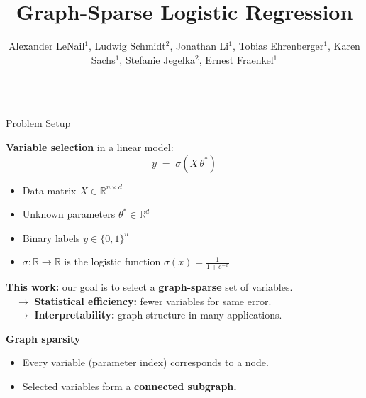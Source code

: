 \documentclass[svgnames,final]{beamer}
\title{Graph-Sparse Logistic Regression}
\author{Alexander LeNail$^1$, Ludwig Schmidt$^2$, Jonathan Li$^1$, Tobias Ehrenberger$^1$, Karen Sachs$^1$, Stefanie Jegelka$^2$, Ernest Fraenkel$^1$}
\institute{$^1$MIT BE, $^2$MIT CSAIL}
\newcommand{\R}{\ensuremath{\mathbb{R}}}
\newcommand{\thetastar}{\ensuremath{\theta^*}}
\begin{document}
\newlength{\gextlength}
\setlength{\gextlength}{14pt}
\newlength{\gselradius}
\setlength{\gselradius}{38pt}

\begin{frame}
\vspace{-.5cm}
\begin{columns}[T]

\begin{column}{.3\linewidth}

	\begin{block}{Problem Setup}

    \vspace{-.8cm}

    \textbf{Variable selection} in a linear model:
    {\Large
    \[
      y \; = \; \sigma(X \,  \thetastar)
    \]
    }

    \vspace{-.7cm}

    \begin{itemize}
      \item Data matrix $X \in \R^{n \times d}$\\[.2cm]
      \item Unknown parameters $\thetastar \in \R^d$\\[.2cm]
      \item Binary labels $y \in \{0,1\}^n$\\[.2cm]
      \item $\sigma: \R \rightarrow \R$ is the logistic function $\sigma(x) = \frac{1}{1 + e^{-x}}$
    \end{itemize}

    \vspace{1.2cm}
    \textbf{This work:} our goal is to select a \textbf{graph-sparse} set of variables.\\[.5cm]
    $\quad\rightarrow$ \textbf{Statistical efficiency:} fewer variables for same error.\\[.3cm]
    $\quad\rightarrow$ \textbf{Interpretability:} graph-structure in many applications.

    \vspace{1.2cm}
    \textbf{Graph sparsity}
		\begin{itemize}
  		\item Every variable (parameter index) corresponds to a node.\\[.2cm]
			\item Selected variables form a \textbf{connected subgraph.}
    \end{itemize}


\end{block}
\end{column}
\end{columns}
\end{frame}
\end{document}

